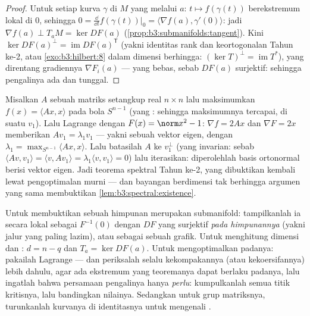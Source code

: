 \begin{proof}
Untuk setiap kurva $\gamma$ di $M$ yang melalui $a$: $t \mapsto
f(\gamma(t))$ berekstremum lokal di $0$, sehingga $0 =
\frac{\dd}{\dd t}f(\gamma(t))\big|_0 = \langle\nabla f(a),
\gamma'(0)\rangle$: jadi $\nabla f(a) \perp T_aM = \ker DF(a)$
(\cref{prop:b3:submanifolds:tangent}). Kini $\ker DF(a)^\perp
= \operatorname{im}DF(a)^{\mathsf T}$ (yakni identitas rank dan
keortogonalan Tahun ke-2, atau \cref{exo:b3:hilbert:8} dalam dimensi
berhingga: $(\ker T)^\perp = \operatorname{im}T^*$), yang
direntang gradiennya $\nabla F_i(a)$ --- yang bebas, sebab
$DF(a)$ surjektif: sehingga pengalinya ada dan tunggal.
\end{proof}

\begin{example}
\label{ex:b3:submanifolds:rayleigh}
Misalkan $A$ sebuah matriks setangkup real $n\times n$ lalu maksimumkan
$f(x) = \langle Ax, x\rangle$ pada bola $S^{n-1}$
(yang : sehingga maksimumnya tercapai, di suatu $v_1$). Lalu Lagrange
dengan $F(x) = \norm x^2 - 1$: $\nabla f = 2Ax$ dan $\nabla F =
2x$ memberikan $Av_1 = \lambda_1v_1$ --- yakni sebuah vektor eigen, dengan
$\lambda_1 = \max_{S^{n-1}}\langle Ax, x\rangle$. Lalu batasilah
$A$ ke $v_1^\perp$ (yang invarian: sebab $\langle Av, v_1\rangle =
\langle v, Av_1\rangle = \lambda_1\langle v, v_1\rangle = 0$)
lalu iterasikan: diperolehlah basis ortonormal berisi vektor eigen. Jadi
teorema spektral Tahun ke-2, yang dibuktikan kembali lewat pengoptimalan murni
--- dan bayangan berdimensi tak berhingga argumen yang sama
membuktikan \cref{lem:b3:spectral:existence}.
\end{example}

\begin{method}\label{met:b3:submanifolds:method}
Untuk membuktikan sebuah himpunan merupakan submanifold: tampilkanlah ia secara lokal sebagai
$F^{-1}(0)$ dengan $DF$ yang surjektif \emph{pada himpunannya} (yakni jalur yang
paling lazim), atau sebagai sebuah grafik. Untuk menghitung dimensi dan
: $d = n - q$ dan $T_a = \ker DF(a)$. Untuk
mengoptimalkan padanya: pakailah Lagrange --- dan periksalah selalu kekompakannya (atau
kekoersifannya) lebih dahulu, agar ada ekstremum yang teoremanya
dapat berlaku padanya, lalu ingatlah bahwa persamaan pengalinya hanya
\emph{perlu}: kumpulkanlah semua titik kritisnya, lalu bandingkan
nilainya. Sedangkan untuk grup matriksnya, turunkanlah kurvanya di
identitasnya untuk mengenali .
\end{method}

